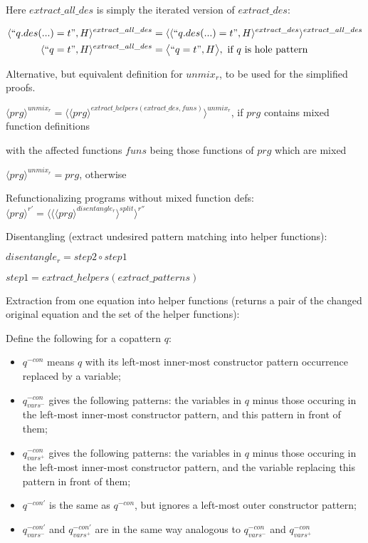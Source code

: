 \documentclass[11pt]{article} %
\begin{document}
Here $extract\_all\_des$ is simply the iterated version of $extract\_des$:

\begin{alignat*}{2}
\langle `` q.des(...) = t ", H \rangle^{extract\_all\_des} & = \langle \langle `` q.des(...) = t ", H \rangle^{extract\_des} \rangle^{extract\_all\_des} \\
\langle `` q = t ", H \rangle^{extract\_all\_des} & = \big\langle `` q = t ", H \big\rangle, \textrm{ if $q$ is hole pattern}
\end{alignat*}

\begin{framed}
Alternative, but equivalent definition for $unmix_r$, to be used for the simplified proofs.

$\langle prg \rangle^{unmix_r} = \langle \langle prg \rangle^{extract\_helpers(extract\_des, funs)} \rangle^{unmix_r}$, if $prg$ contains mixed function definitions

with the affected functions $funs$ being those functions of $prg$ which are mixed

$\langle prg \rangle^{unmix_r} = prg$, otherwise

\end{framed}

Refunctionalizing programs without mixed function defs: $\langle prg \rangle^{r'} = \langle \langle \langle prg \rangle^{disentangle_r} \rangle^{split} \rangle^{r''}$

Disentangling (extract undesired pattern matching into helper functions):

$disentangle_r = step2 \circ step1$

$step1 = extract\_helpers(extract\_patterns)$

Extraction from one equation into helper functions (returns a pair of the changed original equation and the set of the helper functions):

Define the following for a copattern $q$:

\begin{itemize}
\item $q^{-con}$ means $q$ with its left-most inner-most constructor pattern occurrence replaced by a variable;
\item $q^{-con}_{vars^-}$ gives the following patterns: the variables in $q$ minus those occuring in the left-most inner-most constructor pattern, and this pattern in front of them;
\item $q^{-con}_{vars^+}$ gives the following patterns: the variables in $q$ minus those occuring in the left-most inner-most constructor pattern, and the variable replacing this pattern in front of them;
\item $q^{-con'}$ is the same as $q^{-con}$, but ignores a left-most outer constructor pattern;
\item $q^{-con'}_{vars^-}$ and $q^{-con'}_{vars^+}$ are in the same way analogous to $q^{-con}_{vars^-}$ and $q^{-con}_{vars^+}$
\end{itemize}
\end{document}
